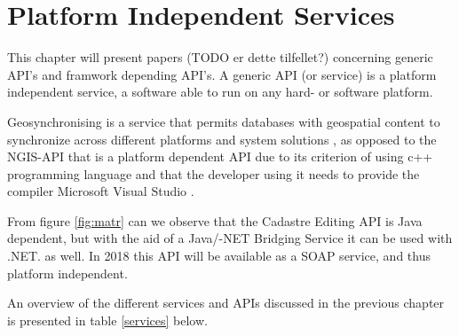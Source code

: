 

\chapter{Platform Independent Services}

This chapter will present papers (TODO er dette tilfellet?) concerning generic API's and framwork depending API's. A generic API (or service) is a platform independent service, a software able to run on any hard- or software platform.

Geosynchronising is a service that permits databases with geospatial content to synchronize across different platforms and system solutions \citep{Kartverket2013}, as opposed to the NGIS-API that is a platform dependent API due to its criterion of using c++ programming language and that the developer using it needs to provide the compiler Microsoft Visual Studio \citep{Kartverket2017b, Norkart2011}.

From figure \ref{fig:matr} can we observe that the Cadastre Editing API is Java dependent, but with the aid of a Java/-NET Bridging Service it can be used with .NET. as well. In 2018 this API will be available as a SOAP service, and thus platform independent. 

An overview of the different services and APIs discussed in the previous chapter is presented in table \ref{services} below.

